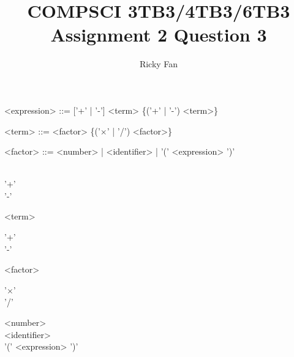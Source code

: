 \documentclass{article}
\title{COMPSCI 3TB3/4TB3/6TB3 Assignment 2 Question 3}
\author{Ricky Fan}
\begin{document}
\maketitle

\begin{grammar}
    <expression> ::= ['+' | '-'] <term> \{('+' | '-') <term>\}
 
   <term> ::= <factor> \{('$\times$' | '/') <factor>\}
 
   <factor> ::= <number> | <identifier> | '(' <expression> ')'
\end{grammar}

\begin{syntdiag} %
    \begin{stack} \\
        '+' \\
        '-'
    \end{stack}
    \begin{rep}
        <term> \\
        \begin{stack} 
            '+' \\
            '-'
        \end{stack}
    \end{rep}
\end{syntdiag}

\begin{syntdiag} %
    \begin{rep}
        <factor> \\
        \begin{stack} 
            '$\times$' \\
            '/'
        \end{stack}
    \end{rep}
\end{syntdiag}

\begin{syntdiag} %
    \begin{stack} 
        <number> \\
        <identifier> \\
        '(' <expression> ')'
    \end{stack}
\end{syntdiag}
\end{document}

